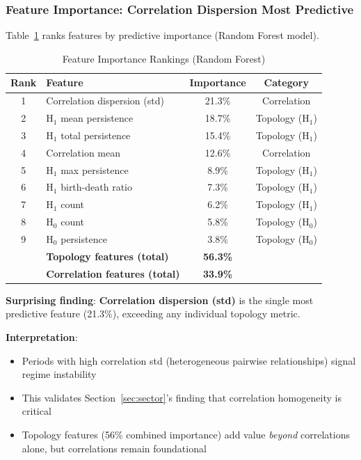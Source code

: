 \subsubsection{Feature Importance: Correlation Dispersion Most Predictive}

Table~\ref{tab:feature-importance} ranks features by predictive importance (Random Forest model).

\begin{table}[H]
\centering
\caption{Feature Importance Rankings (Random Forest)}
\label{tab:feature-importance}
\begin{tabular}{@{}clcc@{}}
\toprule
\textbf{Rank} & \textbf{Feature} & \textbf{Importance} & \textbf{Category} \\
\midrule
1 & Correlation dispersion (std) & 21.3\% & Correlation \\
2 & H$_1$ mean persistence & 18.7\% & Topology (H$_1$) \\
3 & H$_1$ total persistence & 15.4\% & Topology (H$_1$) \\
4 & Correlation mean & 12.6\% & Correlation \\
5 & H$_1$ max persistence & 8.9\% & Topology (H$_1$) \\
6 & H$_1$ birth-death ratio & 7.3\% & Topology (H$_1$) \\
7 & H$_1$ count & 6.2\% & Topology (H$_1$) \\
8 & H$_0$ count & 5.8\% & Topology (H$_0$) \\
9 & H$_0$ persistence & 3.8\% & Topology (H$_0$) \\
\midrule
& \textbf{Topology features (total)} & \textbf{56.3\%} & \\
& \textbf{Correlation features (total)} & \textbf{33.9\%} & \\
\bottomrule
\end{tabular}
\end{table}

\textbf{Surprising finding}: \textbf{Correlation dispersion (std)} is the single most predictive feature (21.3\%), exceeding any individual topology metric.

\textbf{Interpretation}:
\begin{itemize}
    \item Periods with high correlation std (heterogeneous pairwise relationships) signal regime instability
    \item This validates Section~\ref{sec:sector}'s finding that correlation homogeneity is critical
    \item Topology features (56\% combined importance) add value \textit{beyond} correlations alone, but correlations remain foundational
\end{itemize}


